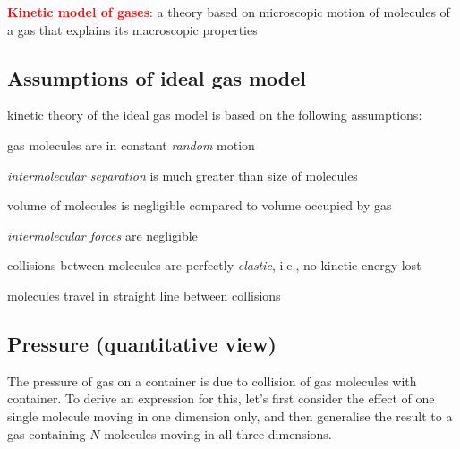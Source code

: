 \documentclass[a4paper,12pt]{book}
\newenvironment{ilight}
  {\centering
  	\vspace*{6pt}
  	\begin{tcolorbox}[colframe=Gray,colback=LightGrey!15]
  \setlength{\baselineskip}{\baselineskip}%
  }
  {\end{tcolorbox}\vspace*{-4pt}}
\newcommand{\keypoint}[1]{\textbf{\textcolor{red}{#1}}}
\newcommand{\keypoint}[1]{\textbf{\textcolor{red}{#1}}}
\begin{document}
\keypoint{Kinetic model of gases}: a theory based on microscopic motion of molecules of a gas that explains its macroscopic properties

\subsection{Assumptions of ideal gas model}

\begin{ilight}
	
kinetic theory of the ideal gas model is based on the following assumptions:

\begin{compactitem}
	
\item[--] gas molecules are in constant \emph{random} motion
	
\item[--] \emph{intermolecular separation} is much greater than size of molecules

volume of molecules is negligible compared to volume occupied by gas

\item[--] \emph{intermolecular forces} are negligible

\item[--] collisions between molecules are perfectly \emph{elastic}, i.e., no kinetic energy lost

\item[--] molecules travel in straight line between collisions
\end{compactitem}

\end{ilight}

\subsection{Pressure (quantitative view)}

The pressure of gas on a container is due to collision of gas molecules with container. To derive an expression for this, let's first consider the effect of one single molecule moving in one dimension only, and then generalise the result to a gas containing $N$ molecules moving in all three dimensions.
\end{document}
